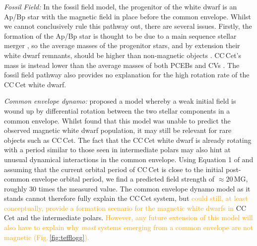 \documentclass[fleqn,usenatbib]{mnras}
\newcommand{\bgs}[1]{\textcolor{orange}{#1}}
\begin{document}

\textit{Fossil Field:} In the fossil field model, the progenitor of the white dwarf is an Ap/Bp star with the magnetic field in place before the common envelope. Whilst we cannot conclusively rule this pathway out, there are several issues. Firstly, the formation of the Ap/Bp star is thought to be due to a main sequence stellar merger \citep{braithwaite+spruit04-1}, so the average masses of the progenitor stars, and by extension their white dwarf remnants, should be higher than non-magnetic objects \citep{ferrarioetal20-1}. CC\,Cet's mass is instead lower than the average masses of both PCEBs and CVs \citep{zorotovicetal11-1}. The fossil field pathway also provides no explanation for the high rotation rate of the CC\,Cet white dwarf.

\textit{Common envelope dynamo:} \citep{briggsetal18-1} proposed a model whereby a weak initial field is wound up by differential rotation between the two stellar components in a common envelope. Whilst \citet{bellonietal20-1} found that this model was unable to predict the observed magnetic white dwarf population, it may still be relevant for rare objects such as CC\,Cet. The fact that the CC\,Cet white dwarf is already rotating with a period similar to those seen in intermediate polars may also hint at unusual dynamical interactions in the common envelope. Using Equation 1 of \citet{briggsetal18-1} and assuming that the current orbital period of CC\,Cet is close to the initial post-common envelope orbital period, we find a predicted field strength of $\approx20 $\,MG, roughly 30 times the measured value. The common envelope dynamo model as it stands cannot therefore fully explain the CC\,Cet system, but \bgs{could still, at least conceptually, provide a formation scenario for the magnetic white dwarfs in}
CC\,Cet and the intermediate polars. \bgs{However, any future extension of this model will also have to explain why \textit{most} systems emerging from a common envelope are not magnetic (Fig.\,\ref{fig:tefflogg}).}

\end{document}
